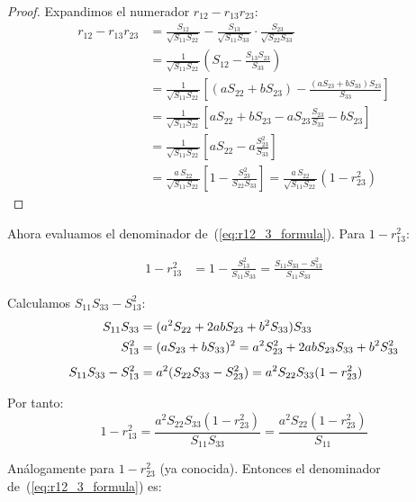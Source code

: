 \documentclass[12pt, letterpaper]{article}
\theoremstyle{remark}
\begin{document}
\begin{proof}
Expandimos el numerador $r_{12} - r_{13} r_{23}$:
\begin{align*}
  r_{12} - r_{13} r_{23}
  &= \frac{S_{12}}{\sqrt{S_{11}S_{22}}}
   - \frac{S_{13}}{\sqrt{S_{11}S_{33}}} \cdot \frac{S_{23}}{\sqrt{S_{22}S_{33}}}\\[4pt]
  &= \frac{1}{\sqrt{S_{11}S_{22}}}
     \left(S_{12} - \frac{S_{13}S_{23}}{S_{33}}\right)\\[4pt]
  &= \frac{1}{\sqrt{S_{11}S_{22}}}
     \left[(aS_{22}+bS_{23}) - \frac{(aS_{23}+bS_{33})S_{23}}{S_{33}}\right]\\[4pt]
  &= \frac{1}{\sqrt{S_{11}S_{22}}}
     \left[aS_{22} + bS_{23} - aS_{23}\frac{S_{23}}{S_{33}} - bS_{23}\right]\\[4pt]
  &= \frac{1}{\sqrt{S_{11}S_{22}}}
     \left[aS_{22} - a\frac{S_{23}^2}{S_{33}}\right]\\[4pt]
  &= \frac{a\,S_{22}}{\sqrt{S_{11}S_{22}}}
     \left[1 - \frac{S_{23}^2}{S_{22}S_{33}}\right]
   = \frac{a\,S_{22}}{\sqrt{S_{11}S_{22}}}(1 - r_{23}^2)
\end{align*}
\end{proof}

Ahora evaluamos el denominador de~(\ref{eq:r12_3_formula}). Para $1-r_{13}^2$:

\begin{align}
  1 - r_{13}^2
  &= 1 - \frac{S_{13}^2}{S_{11}S_{33}}
   = \frac{S_{11}S_{33} - S_{13}^2}{S_{11}S_{33}}
  \label{eq:1mr13}
\end{align}

Calculamos $S_{11}S_{33} - S_{13}^2$:
\begin{align}
  S_{11}S_{33}
  &= (a^2 S_{22}+2ab S_{23}+b^2 S_{33})S_{33} \notag\\
  S_{13}^2
  &= (aS_{23}+bS_{33})^2 = a^2 S_{23}^2 + 2ab S_{23}S_{33} + b^2 S_{33}^2 \notag\\[4pt]
  S_{11}S_{33} - S_{13}^2
  &= a^2(S_{22}S_{33} - S_{23}^2)
   = a^2 S_{22}S_{33}(1 - r_{23}^2)
  \label{eq:det_parcial}
\end{align}

Por tanto:
\begin{equation}
  1 - r_{13}^2 = \frac{a^2 S_{22}S_{33}(1-r_{23}^2)}{S_{11}S_{33}}
               = \frac{a^2 S_{22}(1-r_{23}^2)}{S_{11}}
  \label{eq:1mr13_final}
\end{equation}

Análogamente para $1 - r_{23}^2$ (ya conocida). Entonces el denominador de~(\ref{eq:r12_3_formula}) es:
\end{document}
